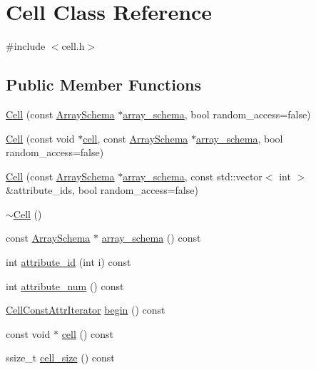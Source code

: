 \hypertarget{classCell}{}\section{Cell Class Reference}
\label{classCell}


{\ttfamily \#include $<$cell.\+h$>$}

\subsection*{Public Member Functions}
\begin{DoxyCompactItemize}
\item 
\hyperlink{classCell_a063bf0cf454dc4c7a67ad993d363d493}{Cell} (const \hyperlink{classArraySchema}{Array\+Schema} $\ast$\hyperlink{classCell_afbe3cca8030270dd483ec965b39f3ddb}{array\+\_\+schema}, bool random\+\_\+access=false)
\item 
\hyperlink{classCell_a1467f30ec1804188067ae0c0b4de1725}{Cell} (const void $\ast$\hyperlink{classCell_a1387c431e72e5249686ca153bbe00150}{cell}, const \hyperlink{classArraySchema}{Array\+Schema} $\ast$\hyperlink{classCell_afbe3cca8030270dd483ec965b39f3ddb}{array\+\_\+schema}, bool random\+\_\+access=false)
\item 
\hyperlink{classCell_afbebf07353e461b5032b08895929403e}{Cell} (const \hyperlink{classArraySchema}{Array\+Schema} $\ast$\hyperlink{classCell_afbe3cca8030270dd483ec965b39f3ddb}{array\+\_\+schema}, const std\+::vector$<$ int $>$ \&attribute\+\_\+ids, bool random\+\_\+access=false)
\item 
\hyperlink{classCell_a9fa559f7a28e2b4336c6879ca09304d8}{$\sim$\+Cell} ()
\item 
const \hyperlink{classArraySchema}{Array\+Schema} $\ast$ \hyperlink{classCell_afbe3cca8030270dd483ec965b39f3ddb}{array\+\_\+schema} () const 
\item 
int \hyperlink{classCell_ad07f4719a927282de04d69c8c3d5f45d}{attribute\+\_\+id} (int i) const 
\item 
int \hyperlink{classCell_aa321d3c0ff75c976a31bb4676ac28b23}{attribute\+\_\+num} () const 
\item 
\hyperlink{classCellConstAttrIterator}{Cell\+Const\+Attr\+Iterator} \hyperlink{classCell_a8ddfa44d513688c020384f164eff734c}{begin} () const 
\item 
const void $\ast$ \hyperlink{classCell_a1387c431e72e5249686ca153bbe00150}{cell} () const 
\item 
ssize\+\_\+t \hyperlink{classCell_a83db2b44c3071c17e70ab55641b14e9f}{cell\+\_\+size} () const 

\end{DoxyCompactItemize}
